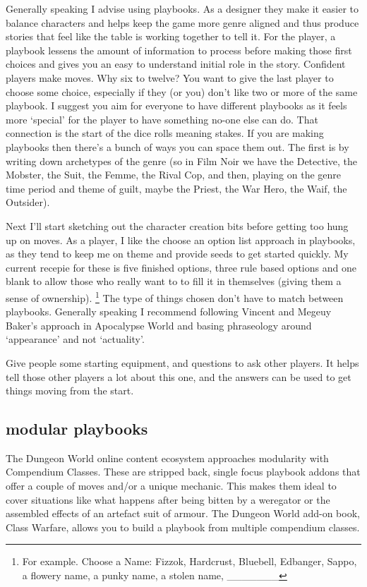 \documentclass{tufte-handout}
\begin{document}
Generally speaking I advise using playbooks. As a designer they make it easier to balance characters and helps keep the game more genre aligned and thus produce stories that feel like the table is working together to tell it. For the player, a playbook lessens the amount of information to process before making those first choices and gives you an easy to understand initial role in the story. Confident players make moves.
Why six to twelve? You want to give the last player to choose some choice, especially if they (or you) don't like two or more of the same playbook. I suggest you aim for everyone to have different playbooks as it feels more `special' for the player to have something no-one else can do. That connection is the start of the dice rolls meaning stakes.
If you are making playbooks then there's a bunch of ways you can space them out.  The first is by writing down archetypes of the genre (so in Film Noir we have the Detective, the Mobster, the Suit, the Femme, the Rival Cop, and then, playing on the genre time period and theme of guilt, maybe the Priest, the War Hero, the Waif, the Outsider). 

Next I'll start sketching out the character creation bits before getting too hung up on moves. 
As a player, I like the choose an option list approach in playbooks, as they tend to keep me on theme and provide seeds to get started quickly. My current recepie for these is five finished options, three rule based options and one blank to allow those who really want to to fill it in themselves (giving them a sense of ownership). \footnote{For example. Choose a Name: Fizzok, Hardcrust, Bluebell, Edbanger, Sappo, a flowery name, a punky name, a stolen name, \_\_\_\_\_\_\_}  The type of things chosen don't have to match between playbooks. Generally speaking I recommend following Vincent and Megeuy Baker's approach in Apocalypse World and basing phraseology around `appearance' and not `actuality'. 

Give people some starting equipment, and questions to ask other players. It helps tell those other players a lot about this one, and the answers can be used to get things moving from the start.

\subsection{modular playbooks}
The Dungeon World online content ecosystem approaches modularity with Compendium Classes. These are stripped back, single focus playbook addons that offer a couple of moves and/or a unique mechanic. This makes them ideal to cover situations like what happens after being bitten by a weregator or the assembled effects of an artefact suit of armour. The Dungeon World add-on book, Class Warfare, allows you to build a playbook from multiple compendium classes.
\end{document}
